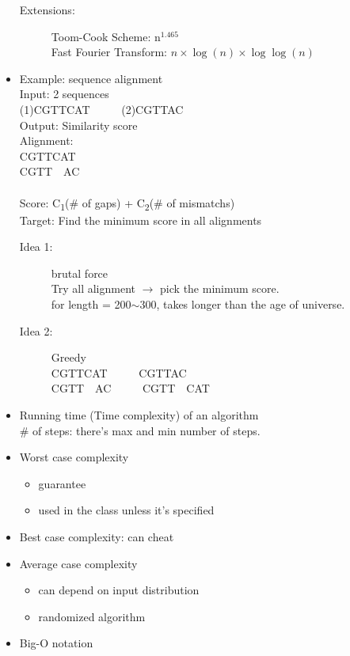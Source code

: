 \documentclass[12pt]{report}
\begin{document}
\begin{itemize}
\begin{description}
\item[Extensions:]Toom-Cook Scheme: n$^{1.465}$\\
Fast Fourier Transform: $n\times\log(n)\times\log\log(n)$
\end{description}
\item Example: sequence alignment\\
Input: 2 sequences\\
\hspace*{2.6em} (1)CGTTCAT ~~~~~(2)CGTTAC\\
Output: Similarity score\\
Alignment: \\
\hspace*{2em}CGTTCAT\\
\hspace*{2em}CGTT~~AC\\
\\
Score: C\textsubscript{1}(\# of gaps) + C\textsubscript{2}(\# of mismatchs)\\
Target: Find the minimum score in all alignments
\begin{description}
\item[Idea 1:]brutal force\\
Try all alignment $\rightarrow$ pick the minimum score.\\
for length = 200$\sim$300, takes longer than the age of universe.
\item[Idea 2:]Greedy\\[0.8em]
CGTTCAT ~~~~~CGTTAC\\
CGTT~~AC ~~~~~CGTT~~CAT\\
\end{description}
\item Running time (Time complexity) of an algorithm\\
\# of steps: there's max and min number of steps.
\item Worst case complexity
\begin{itemize}
\item guarantee
\item used in the class unless it's specified
\end{itemize}
\item Best case complexity: can cheat
\item Average case complexity

\begin{itemize}
\item can depend on input distribution
\item randomized algorithm
\end{itemize}

\item Big-O notation

\end{itemize}
\end{document}
